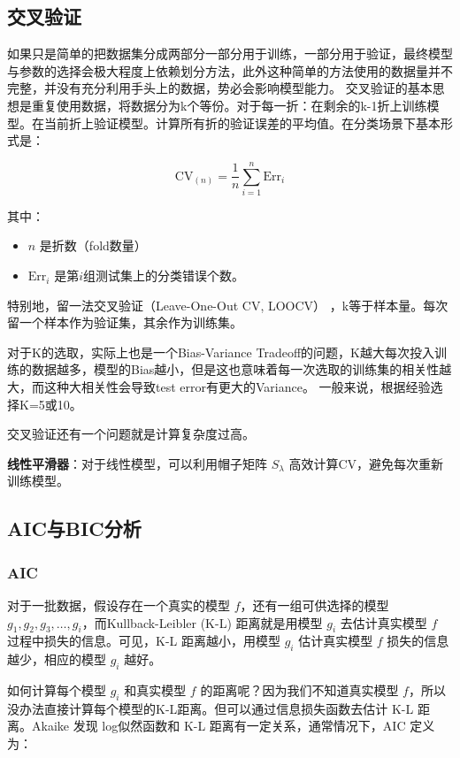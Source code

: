 \documentclass[11pt,a4paper]{article}
\begin{document}
\subsection{交叉验证}
如果只是简单的把数据集分成两部分一部分用于训练，一部分用于验证，最终模型与参数的选择会极大程度上依赖划分方法，此外这种简单的方法使用的数据量并不完整，并没有充分利用手头上的数据，势必会影响模型能力。
交叉验证的基本思想是重复使用数据，将数据分为k个等份。对于每一折：在剩余的k-1折上训练模型。在当前折上验证模型。计算所有折的验证误差的平均值。在分类场景下基本形式是：

\[
\mathrm{CV}_{(n)}=\frac{1}{n}\sum_{i=1}^n\mathrm{Err}_i
\]

其中：
\begin{itemize}
    \item $n$ 是折数（fold数量）
    \item $\mathrm{Err}_i$ 是第$i$组测试集上的分类错误个数。
\end{itemize}

特别地，留一法交叉验证（Leave-One-Out CV, LOOCV） ，k等于样本量。每次留一个样本作为验证集，其余作为训练集。

对于K的选取，实际上也是一个Bias-Variance Tradeoff的问题，K越大每次投入训练的数据越多，模型的Bias越小，但是这也意味着每一次选取的训练集的相关性越大，而这种大相关性会导致test error有更大的Variance。
一般来说，根据经验选择K=5或10。

交叉验证还有一个问题就是计算复杂度过高。

\textbf{线性平滑器}：对于线性模型，可以利用帽子矩阵 $S_\lambda$ 高效计算CV，避免每次重新训练模型。

\subsection{AIC与BIC分析}
\subsubsection{AIC} 
对于一批数据，假设存在一个真实的模型 \( f \)，还有一组可供选择的模型 \( g_1, g_2, g_3, \dots, g_i \)，而Kullback-Leibler (K-L) 距离就是用模型 \( g_i \) 去估计真实模型 \( f \) 过程中损失的信息。可见，K-L 距离越小，用模型 \( g_i \) 估计真实模型 \( f \) 损失的信息越少，相应的模型 \( g_i \) 越好。

如何计算每个模型 \( g_i \) 和真实模型 \( f \) 的距离呢？因为我们不知道真实模型 \( f \)，所以没办法直接计算每个模型的K-L距离。但可以通过信息损失函数去估计 K-L 距离。Akaike 发现 log似然函数和 K-L 距离有一定关系，通常情况下，AIC 定义为：
\end{document}
